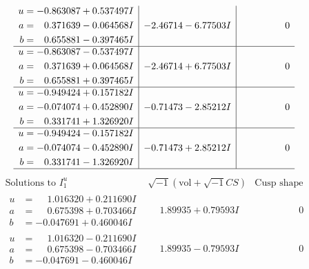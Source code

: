\documentclass[1p]{elsarticle_modified}
\theoremstyle{definition}
\newcommand{\I}{\sqrt{-1}}
\begin{document}
$$\begin{array}{c|c|c}
\begin{aligned}
u &= -0.863087 + 0.537497 I \\
a &= \phantom{-}0.371639 - 0.064568 I \\
b &= \phantom{-}0.655881 - 0.397465 I\end{aligned}
 & -2.46714 - 6.77503 I & \phantom{-0.000000 } 0 \\ \hline\begin{aligned}
u &= -0.863087 - 0.537497 I \\
a &= \phantom{-}0.371639 + 0.064568 I \\
b &= \phantom{-}0.655881 + 0.397465 I\end{aligned}
 & -2.46714 + 6.77503 I & \phantom{-0.000000 } 0 \\ \hline\begin{aligned}
u &= -0.949424 + 0.157182 I \\
a &= -0.074074 + 0.452890 I \\
b &= \phantom{-}0.331741 + 1.326920 I\end{aligned}
 & -0.71473 - 2.85212 I & \phantom{-0.000000 } 0 \\ \hline\begin{aligned}
u &= -0.949424 - 0.157182 I \\
a &= -0.074074 - 0.452890 I \\
b &= \phantom{-}0.331741 - 1.326920 I\end{aligned}
 & -0.71473 + 2.85212 I & \phantom{-0.000000 } 0\\
 \hline 
 \end{array}$$\newpage$$\begin{array}{c|c|c}  
\text{Solutions to }I^u_{1}& \I (\text{vol} + \sqrt{-1}CS) & \text{Cusp shape}\\
 \hline 
\begin{aligned}
u &= \phantom{-}1.016320 + 0.211690 I \\
a &= \phantom{-}0.675398 + 0.703466 I \\
b &= -0.047691 + 0.460046 I\end{aligned}
 & \phantom{-}1.89935 + 0.79593 I & \phantom{-0.000000 } 0 \\ \hline\begin{aligned}
u &= \phantom{-}1.016320 - 0.211690 I \\
a &= \phantom{-}0.675398 - 0.703466 I \\
b &= -0.047691 - 0.460046 I\end{aligned}
 & \phantom{-}1.89935 - 0.79593 I & \phantom{-0.000000 } 0 \\ \hline\begin{aligned}

\end{aligned}
\end{array}$$
\end{document}
